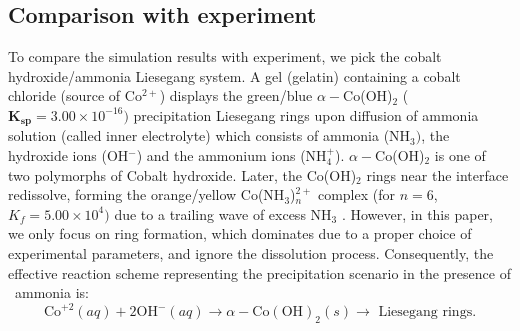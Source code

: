 \documentclass[aps,preprint]{revtex4}
\begin{document}
\subsection{Comparison with experiment}

To compare the simulation results with experiment, we pick the cobalt
hydroxide/ammonia Liesegang system\cite{alghoulcrys}. A gel (gelatin)
containing a cobalt chloride (source of Co$^{2+}$) displays the green/blue $\alpha-$Co(OH)$_{2}$
($\mathbf{K}_{\mathbf{sp}}=3.00\times10^{-16})$ precipitation Liesegang rings
upon diffusion of ammonia solution (called inner electrolyte) which consists of
ammonia (NH$_{3})$, the hydroxide ions (OH$^{-}$) and the ammonium ions
(NH$_{4}^{+}$). $\alpha-$Co(OH)$_{2}$ is one of two polymorphs of Cobalt
hydroxide\cite{polymorph}. Later, the Co(OH)$_{2}$ rings near the interface
redissolve, forming the orange/yellow Co(NH$_{3}$)$_{n}^{2+}$ complex (for
$n=6$, $K_{f}=5.00\times10^{4})$ due to a trailing wave of excess NH$_{3}$
\cite{lloyd}. However, in this paper, we only focus on ring formation, which
dominates due to a proper choice of experimental parameters, and ignore the
dissolution process. Consequently, the effective reaction scheme representing
the precipitation scenario in the presence of \ ammonia is:
\begin{equation}
\text{Co}^{+2}(aq)+2\text{OH}^{-}(aq)\rightarrow\alpha-\text{Co}
(\text{OH})_{2}(s)\rightarrow\text{~Liesegang~rings}.
\end{equation}
\end{document}
